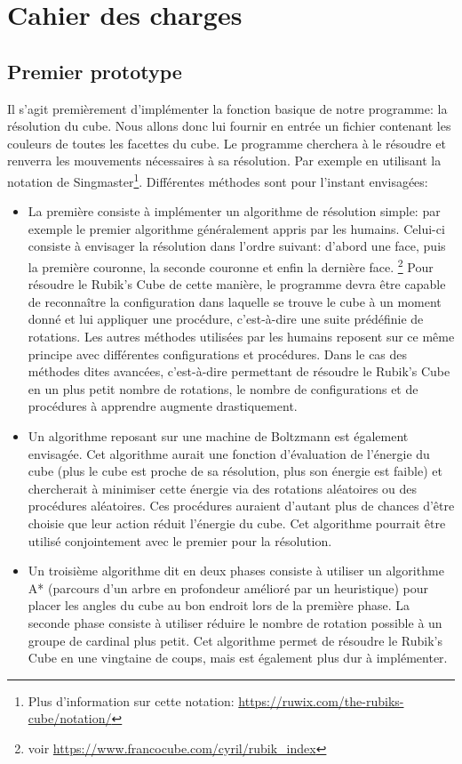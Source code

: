 
\chapter{Cahier des charges}
\section{Premier prototype}
Il s'agit premièrement d'implémenter la fonction basique de notre programme: la résolution du cube. Nous allons donc lui fournir en entrée un fichier contenant les couleurs de toutes les facettes du cube. Le programme cherchera à le résoudre et renverra les mouvements nécessaires à sa résolution. Par exemple en utilisant la notation de Singmaster\footnote{Plus d'information sur cette notation: \url{https://ruwix.com/the-rubiks-cube/notation/}}.
Différentes méthodes sont pour l'instant envisagées:
\begin{itemize}
    \item La première consiste à implémenter un algorithme de résolution simple: par exemple le premier algorithme généralement appris par les humains. Celui-ci consiste à envisager la résolution dans l'ordre suivant: d'abord une face, puis la première couronne, la seconde couronne et enfin la dernière face. \footnote {voir \url{https://www.francocube.com/cyril/rubik_index}} Pour résoudre le Rubik's Cube de cette manière, le programme devra être capable de reconnaître la configuration dans laquelle se trouve le cube à un moment donné et lui
    appliquer une procédure, c'est-à-dire une suite prédéfinie de rotations. Les autres méthodes utilisées par les humains reposent sur ce même principe avec différentes configurations et procédures. Dans le cas des méthodes dites avancées, c'est-à-dire permettant de résoudre le Rubik's Cube en un plus petit nombre de rotations, le nombre de configurations et de procédures à apprendre augmente drastiquement.
    \item Un algorithme reposant sur une machine de Boltzmann est également envisagée. Cet algorithme aurait une fonction d'évaluation de l'énergie du cube (plus le cube est proche de sa résolution, plus son énergie est faible) et chercherait à minimiser cette énergie via des rotations aléatoires ou des procédures aléatoires. Ces procédures auraient d'autant plus de chances d'être choisie que leur action réduit l'énergie du cube. Cet algorithme pourrait être utilisé conjointement avec le premier pour la résolution.
    \item Un troisième algorithme dit en deux phases consiste à utiliser un algorithme A* (parcours d'un arbre en profondeur amélioré par un heuristique) pour placer les angles du cube au bon endroit lors de la première phase. La seconde phase consiste à utiliser réduire le nombre de rotation possible à un groupe de cardinal plus petit. Cet algorithme permet de résoudre le Rubik's Cube en une vingtaine de coups, mais est également plus dur à implémenter.
\end{itemize}

